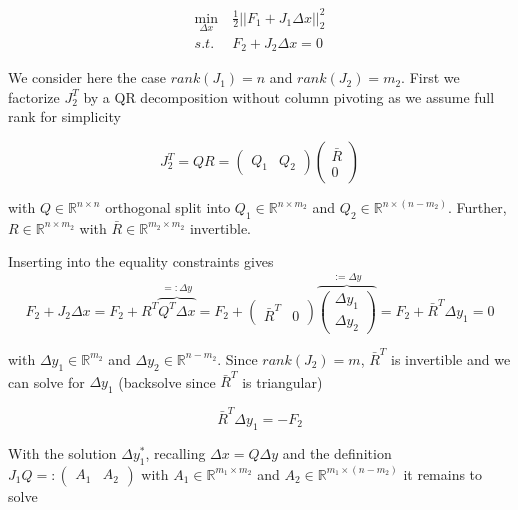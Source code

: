 \documentclass{scrartcl}[12pt, halfparskip]
\numberwithin{equation}{section}
\numberwithin{figure}{section}
\numberwithin{table}{section}
\begin{document}
\begin{align}
	\min_{\Delta x} & \ \frac{1}{2} || F_1 + J_1 \Delta x ||_2^2 \label{eq:numerical_soln_eq_constrained_LSQ} \\
	s.t. & \ F_2 + J_2 \Delta x = 0 \nonumber
\end{align}

We consider here the case $rank(J_1) = n$ and $rank(J_2)=m_2$. First we factorize $J_2^T$ by a QR decomposition without column pivoting as we assume full rank for simplicity

\begin{equation}
	J_2^T = Q R = 
	\begin{pmatrix}
		Q_1 & Q_2
	\end{pmatrix}
	\begin{pmatrix}
		\bar{R} \\
		0
	\end{pmatrix}
\end{equation}

with $Q \in \mathbb{R}^{n \times n}$ orthogonal split into $Q_1 \in \mathbb{R}^{n \times m_2}$ and $Q_2 \in \mathbb{R}^{n \times (n-m_2)}$. Further, $R \in \mathbb{R}^{n \times m_2}$ with $\bar{R} \in \mathbb{R}^{m_2 \times m_2}$ invertible.

Inserting into the equality constraints gives
\begin{equation}
	F_2 + J_2 \Delta x = F_2 + R^T \overbrace{Q^T \Delta x}^{=: \Delta y} = F_2 +
	\begin{pmatrix}
		\bar{R}^T & 0
	\end{pmatrix} 
	\overbrace{
	\begin{pmatrix}
		\Delta y_1 \\
		\Delta y_2
	\end{pmatrix}}^{:= \Delta y} = F_2 + \bar{R}^T \Delta y_1 = 0
\end{equation}

with $\Delta y_1 \in \mathbb{R}^{m_2}$ and $\Delta y_2 \in \mathbb{R}^{n-m_2}$. Since $rank(J_2)=m$, $\bar{R}^T$ is invertible and we can solve for $\Delta y_1$ (backsolve since $\bar{R}^T$ is triangular)

\begin{equation}
	\bar{R}^T \Delta y_1 = -F_2
\end{equation}

With the solution $\Delta y_1^*$, recalling $\Delta x = Q \Delta y$ and the definition $J_1 Q =: \begin{pmatrix} A_1 & A_2 \end{pmatrix}$ with $A_1 \in \mathbb{R}^{m_1 \times m_2}$ and $A_2 \in \mathbb{R}^{m_1 \times (n-m_2)}$ it remains to solve
\end{document}
